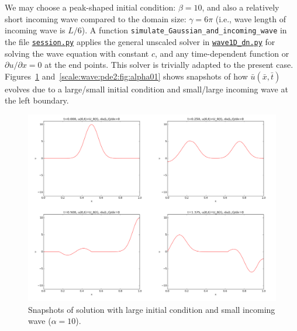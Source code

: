 \documentclass[graybox,envcountchap,sectrefs,final]{svmonodo}
\begin{document}
\noindent
We may choose a peak-shaped initial condition: $\beta = 10$,
and also a relatively short incoming wave compared to the domain size:
$\gamma = 6\pi$ (i.e., wave length of incoming wave is $L/6$).
A function \Verb!simulate_Gaussian_and_incoming_wave! in
the file \href{{http://tinyurl.com/o8pb3yy/session.py}}{\nolinkurl{session.py}}
applies the general unscaled
solver in \href{{http://tinyurl.com/o8pb3yy/wave1D_dn.py}}{\nolinkurl{wave1D_dn.py}}
for solving the wave equation with constant $c$,
and any time-dependent function or $\partial u/\partial x=0$ at the
end points. This solver is trivially adapted to the present case.
Figures~\ref{scale:wave:pde2:fig:alpha10} and~\ref{scale:wave:pde2:fig:alpha01}
shows snapshots of how $\bar u(\bar x,\bar t)$ evolves due to a
large/small initial condition and small/large incoming wave at the left
boundary.


\begin{figure}[!ht]  %
  \centerline{\includegraphics[width=1.0\linewidth]{fig-scaling/gaussian_plus_incoming_alpha10.pdf}}
  \caption{
  Snapshots of solution with large initial condition and small incoming wave ($\alpha=10$). \label{scale:wave:pde2:fig:alpha10}
  }
\end{figure}
\end{document}
